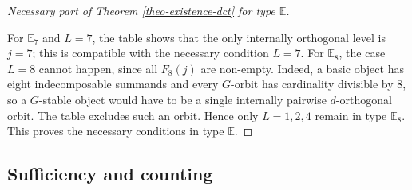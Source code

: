 \documentclass[12pt]{article}
\theoremstyle{plain}
\theoremstyle{definition}
\begin{document}
\begin{proof}[Necessary part of Theorem \ref{theo-existence-dct} for type $\mathbb{E}$]
\begin{center}
\label{tab:E8-FL}
	\end{center}
For \(\mathbb E_7\) and \(L=7\), the table shows that the only internally
orthogonal level is \(j=7\); this is compatible with the necessary condition
\(L=7\).  For \(\mathbb E_8\), the case \(L=8\) cannot happen, since all
\(F_8(j)\) are non-empty.  Indeed, a basic object has eight indecomposable
summands and every \(G\)-orbit has cardinality divisible by \(8\), so a
\(G\)-stable object would have to be a single internally pairwise
\(d\)-orthogonal orbit.  The table excludes such an orbit.  Hence only
\(L=1,2,4\) remain in type \(\mathbb E_8\).  This proves the necessary
conditions in  type $\mathbb{E}$.
\end{proof}

	
	
	

\subsection{Sufficiency and counting}\label{subsection-counting}
\end{document}
